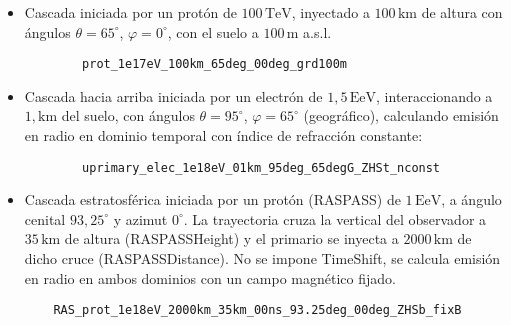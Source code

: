 \documentclass[a4paper,12pt]{article}
\numberwithin{equation}{section}
\numberwithin{figure}{section}
\begin{document}
\begin{itemize}
	\item Cascada iniciada por un protón de $100\,\mathrm{TeV}$, inyectado a $100\,\mathrm{km}$ de altura con ángulos $\theta=65^\circ$, $\varphi=0^\circ$, con el suelo a $100\,\mathrm{m}$ a.s.l.
	\begin{verbatim}
		prot_1e17eV_100km_65deg_00deg_grd100m
	\end{verbatim}
	\item Cascada hacia arriba iniciada por un electrón de $1,5\,\mathrm{EeV}$, interaccionando a $1,\mathrm{km}$ del suelo, con ángulos $\theta = 95^\circ$, $\varphi=65^\circ$ (geográfico), calculando emisión en radio en dominio temporal con índice de refracción constante:
	\begin{verbatim}
		uprimary_elec_1e18eV_01km_95deg_65degG_ZHSt_nconst
	\end{verbatim}
\item Cascada estratosférica iniciada por un protón (RASPASS) de $1\,\mathrm{EeV}$, a ángulo cenital $93,25^\circ$ y azimut $0^\circ$. La trayectoria cruza la vertical del observador a $35\,\mathrm{km}$ de altura (RASPASSHeight) y el primario se inyecta a $2000\,\mathrm{km}$ de dicho cruce (RASPASSDistance). No se impone TimeShift, se calcula emisión en radio en ambos dominios con un campo magnético fijado.
\begin{verbatim}
	RAS_prot_1e18eV_2000km_35km_00ns_93.25deg_00deg_ZHSb_fixB
\end{verbatim}
\end{itemize}
\end{document}
